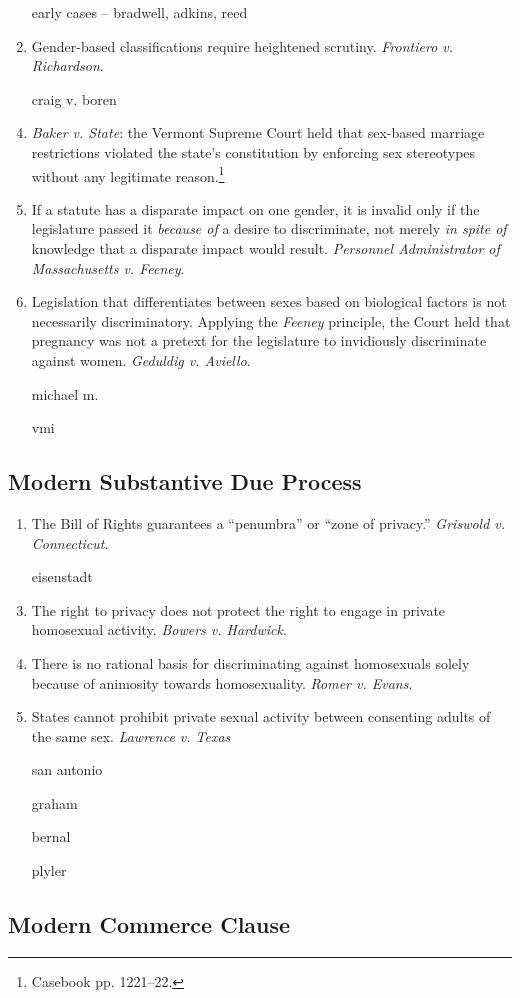 \begin{enumerate}
    \item [early cases -- bradwell, adkins, reed] %
    \item Gender-based classifications require heightened scrutiny. 
    \emph{Frontiero v. Richardson}.
    \item [craig v. boren] %
    \item \emph{Baker v. State}: the Vermont Supreme Court 
    held that sex-based marriage restrictions violated the state's 
    constitution by enforcing sex stereotypes without any legitimate 
    reason.\footnote{Casebook pp. 1221--22.}
    \item If a statute has a disparate impact on one gender, it is invalid 
    only if the legislature passed it \emph{because of} a desire to 
    discriminate, not merely \emph{in spite of} knowledge that a disparate 
    impact would result. \emph{Personnel Administrator of Massachusetts v. 
    Feeney}.
    \item Legislation that differentiates between sexes based on biological 
    factors is not necessarily discriminatory. Applying the \emph{Feeney} 
    principle, the Court held that pregnancy was not a pretext for the 
    legislature to invidiously discriminate against women. \emph{Geduldig v. 
    Aviello}.
    \item [michael m.] %
    \item [vmi] %
\end{enumerate}

\subsection{Modern Substantive Due Process}

\begin{enumerate}
    \item The Bill of Rights guarantees a ``penumbra'' or ``zone of privacy.'' 
    \emph{Griswold v. Connecticut}.
    \item [eisenstadt] %
    \item The right to privacy does not protect the right to engage in private 
    homosexual activity. \emph{Bowers v. Hardwick}.
    \item There is no rational basis for discriminating against homosexuals 
    solely because of animosity towards homosexuality. \emph{Romer v. Evans}.
    \item States cannot prohibit private sexual activity between consenting 
    adults of the same sex. \emph{Lawrence v. Texas}
    \item [san antonio] %
    \item [graham] %
    \item [bernal] %
    \item [plyler] %
\end{enumerate}

\subsection{Modern Commerce Clause}

